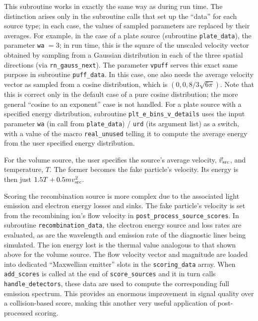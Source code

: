 \documentclass[12pt]{report}
\begin{document}
This subroutine works in exactly the same way as during
run time.  The distinction arises only in the
subroutine calls that set up the ``data''
for each source type; in each case, the values
of sampled parameters are replaced by their averages.
For example, in the 
case of a plate source (subroutine {\tt plate\_data}),
the parameter
{\tt wa} $= 3$; in run time, this is
the square of the
unscaled velocity vector obtained by sampling from
a Gaussian distribution in each of the three spatial
directions (via {\tt rn\_gauss\_next}).  The parameter
{\tt vpuff} serves this exact same purpose in
subroutine {\tt puff\_data}.  In this case, one also
needs the average velocity vector as sampled from a
cosine distribution, which is $(0, 0, 8/3 \sqrt{6 \pi})$.
Note that this is correct only in the default case
of a pure cosine distribution; the more general ``cosine
to an exponent'' case is not handled.
For a plate source with a specified energy distribution,
subroutine {\tt plt\_e\_bins\_v\_details} uses the input
parameter {\tt wa} (in call from {\tt plate\_data}) /
{\tt urd} (its argument list) as a switch, with a value
of the macro {\tt real\_unused} telling it to compute
the average energy from the user specified energy
distribution.

For the volume source, the user specifies the
source's average velocity, $\vec{v}_{\rm src}$, and
temperature, $T$.  The
former becomes the fake particle's velocity.
Its energy is then just $1.5 T + 0.5 m v_{\rm src}^{2}$.

Scoring the recombination source is more complex due to
the associated light emission and electron energy losses
and sinks.  The fake particle's velocity is set from
the recombining ion's flow velocity in
{\tt post\_process\_source\_scores}.  In
subroutine {\tt recombination\_data}, the electron
energy source and loss rates are evaluated, as are the
wavelength and emission rate of the diagnostic lines
being simulated.  The ion energy lost is the thermal
value analogous to that shown above for the volume source.
The flow velocity vector and magnitude are loaded into
dedicated ``Maxwellian emitter'' slots in the
{\tt scoring\_data} array.  When {\tt add\_scores}
is called at the end of {\tt score\_sources} and it
in turn calls {\tt handle\_detectors}, these data are
used to compute the corresponding full emission spectrum.
This provides an enormous improvement in signal quality
over a collision-based score, making this another
very useful application of post-processed scoring.
\end{document}
